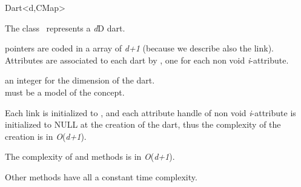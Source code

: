 \ccRefPageBegin
\begin{ccRefClass}{Dart<d,CMap>}


\ccDefinition
  
The class \ccRefName\ represents a \emph{d}D dart.

\betai{} pointers are coded in a array of \emph{d+1} 
(because we describe also the \betazero{} link).  Attributes are
associated to each dart by , one for each
non void \emph{i}-attribute.

\ccIsModel
{}

\ccParameters
{} an integer for the dimension of the dart.\\
 must be a model of the  concept.


\ccTypes
{}
\ccGlue
{}

\ccGlue
{}


Each \betai{} link is initialized to , and each 
attribute handle of non void \emph{i}-attribute is initialized to NULL
at the creation of the dart, thus the complexity of the creation is in
\emph{O}(\emph{d+1}).

The complexity of  and  methods is in
\emph{O}(\emph{d+1}).

Other methods have all a constant time complexity.

\ccSeeAlso
{}

\end{ccRefClass}
\ccRefPageEnd
